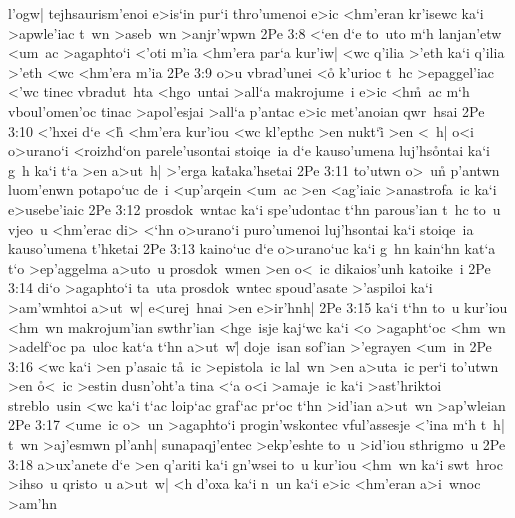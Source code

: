 l'ogw|
tejhsaurism'enoi
e>is`in
pur`i
thro'umenoi
e>ic
<hm'eran
kr'isewc
ka`i
>apwle'iac
t~wn
>aseb~wn
>anjr'wpwn\bibvsend
\vs 2Pe 3:8
<`en
d`e
to~uto
m`h
lanjan'etw
<um~ac
>agaphto`i
<'oti
m'ia
<hm'era
par`a
kur'iw|
<wc
q'ilia
>'eth
ka`i
q'ilia
>'eth
<wc
<hm'era
m'ia\bibvsend
\vs 2Pe 3:9
o>u
vbrad'unei
<o\r{}
k'urioc
t~hc
>epaggel'iac
<'wc
tinec
vbradut~hta
<hgo~untai
>all`a
makrojume~i
e>ic
<h\r{m}~ac
m`h
vboul'omen'oc
tinac
>apol'esjai
>all`a
p'antac
e>ic
met'anoian
qwr~hsai\bibvsend
\vs 2Pe 3:10
<'hxei
d`e
<h\r{}
<hm'era
kur'iou
<wc
kl'epthc
>en
nukt`i\r{}
>en
<~h|
o<i
o>urano`i
<roizhd`on
parele'usontai
stoiqe~ia
d`e
kauso'umena
luj'hs\r{o}ntai
ka`i
g~h
ka`i
t`a
>en
a>ut~h|
>'erga
ka\r{t}aka'hsetai\bibvsend
{}
\vs 2Pe 3:11
to'utwn
o>~u\r{n}
p'antwn
luom'enwn
potapo`uc
de~i
<up'arqein
<um~ac
>en
<ag'iaic
>anastrofa~ic
ka`i
e>usebe'iaic\bibvsend
\vs 2Pe 3:12
prosdok~wntac
ka`i
spe'udontac
t`hn
parous'ian
t~hc
to~u
vjeo~u
<hm'erac
di>
<`hn
o>urano`i
puro'umenoi
luj'hsontai
ka`i
stoiqe~ia
kauso'umena
t'hketai\bibvsend
\vs 2Pe 3:13
kaino`uc
d`e
o>urano`uc
ka`i
g~hn
kain`hn
kat`a
t`o
>ep'aggelma
a>uto~u
prosdok~wmen
>en
o<~ic
dikaios'unh
katoike~i\bibvsend
\vs 2Pe 3:14
di`o
>agaphto`i
ta~uta
prosdok~wntec
spoud'asate
>'aspiloi
ka`i
>am'wmhtoi
a>ut~w|
e<urej~hnai
>en
e>ir'hnh|\bibvsend
\vs 2Pe 3:15
ka`i
t`hn
to~u
kur'iou
<hm~wn
makrojum'ian
swthr'ian
<hge~isje
kaj`wc
ka`i
<o
>agapht`oc
<hm~wn
>adelf`oc
pa~uloc
kat`a
t`hn
a>ut~w|\r{}
doje~isan
sof'ian
>'egrayen
<um~in\bibvsend
\vs 2Pe 3:16
<wc
ka`i
>en
p'asaic
t\r{a}~ic
>epistola~ic
lal~wn
>en
a>uta~ic
per`i
to'utwn
>en
\r{o}<~ic
>estin
dusn'oht'a
tina
<`a
o<i
>amaje~ic
ka`i
>ast'hriktoi
streblo~usin
<wc
ka`i
t`ac
loip`ac
graf`ac
pr`oc
t`hn
>id'ian
a>ut~wn
>ap'wleian\bibvsend
\vs 2Pe 3:17
<ume~ic
o>~un
>agaphto`i
progin'wskontec
vful'assesje
<'ina
m`h
t~h|
t~wn
>aj'esmwn
pl'anh|
sunapaqj'entec
>ekp'eshte
to~u
>id'iou
sthrigmo~u\bibvsend
\vs 2Pe 3:18
a>ux'anete
d`e
>en
q'ariti
ka`i
gn'wsei
to~u
kur'iou
<hm~wn
ka`i
swt~hroc
>ihso~u
qristo~u
a>ut~w|
<h
d'oxa
ka`i
n~un
ka`i
e>ic
<hm'eran
a>i~wnoc
>am'hn\bibvsend

